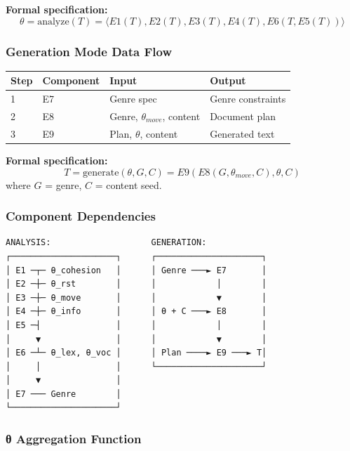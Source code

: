 \textbf{Formal specification:}
\begin{equation}
\theta = \text{analyze}(T) = \langle E1(T), E2(T), E3(T), E4(T), E6(T, E5(T)) \rangle
\end{equation}

\subsubsection{Generation Mode Data Flow}

\begin{center}
\begin{tabular}{llll}
\toprule
Step & Component & Input & Output \\
\midrule
1 & E7 & Genre spec & Genre constraints \\
2 & E8 & Genre, $\theta_{move}$, content & Document plan \\
3 & E9 & Plan, $\theta$, content & Generated text \\
\bottomrule
\end{tabular}
\end{center}

\textbf{Formal specification:}
\begin{equation}
T = \text{generate}(\theta, G, C) = E9(E8(G, \theta_{move}, C), \theta, C)
\end{equation}
where $G$ = genre, $C$ = content seed.

\subsubsection{Component Dependencies}

\begin{verbatim}
ANALYSIS:                    GENERATION:
┌─────────────────────┐      ┌─────────────────────┐
│ E1 ─┬─ θ_cohesion   │      │ Genre ───► E7       │
│ E2 ─┼─ θ_rst        │      │            │        │
│ E3 ─┼─ θ_move       │      │            ▼        │
│ E4 ─┼─ θ_info       │      │ θ + C ───► E8       │
│ E5 ─┤               │      │            │        │
│     ▼               │      │            ▼        │
│ E6 ─┴─ θ_lex, θ_voc │      │ Plan ────► E9 ───► T│
│     │               │      └─────────────────────┘
│     ▼               │
│ E7 ─── Genre        │
└─────────────────────┘
\end{verbatim}

\subsubsection{θ Aggregation Function}

